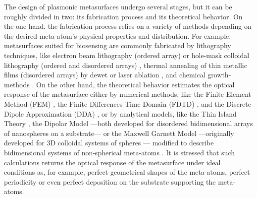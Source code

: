The design of plasmonic metasurfaces undergo several stages, but it can be roughly divided in two: its fabrication process and its theoretical behavior. On the one hand, the fabrication process relies on a variety of methods depending on the desired meta-atom's physical properties and distribution. For example, metasurfaces suited for biosensing are commonly  fabricated by lithography techniques, like electron beam lithography (ordered array) or hole-mask colloidal lithography  (ordered and disordered arrays) \cite{estevez_trends_2014}, thermal annealing of thin metallic films (disordered arrays) by dewet \cite{qiu_dual_2020} or laser ablation \cite{meng_anisotropic_2015}, and chemical growth-methods \cite{estevez_trends_2014,kabashin_plasmonic_2009}. On the other hand, the theoretical behavior estimates the optical response of the metasurface either by numerical methods, like the Finite Element Method (FEM) \cite{feuz_improving_2010}, the Finite Differences Time Domain (FDTD) \cite{qiu_differential_2015}, and the Discrete Dipole Approximation (DDA) \cite{meng_anisotropic_2015}, or by analytical models, like the Thin Island Theory \cite{svedendahl_refractometric_2014,bedeaux_optical_2004}, the Dipolar Model \cite{barrera1991optical} ---both developed for disordered bidimensional arrays of nanospheres on a substrate--- or the Maxwell Garnett Model ---originally developed for 3D colloidal systems of spheres \cite{sihvola_electromagnetic_2008}--- modified to describe bidimensional systems of non-spherical meta-atoms \cite{oates_characterization_2011,kabashin_plasmonic_2009,moirangthem_enhanced_2012}. It is stressed that such calculations returns the optical response of the metasurface under ideal conditions as, for example, perfect geometrical shapes of the meta-atoms, perfect periodicity or even perfect deposition on the substrate supporting the meta-atoms.

